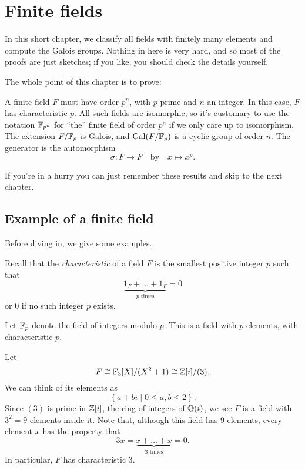 \chapter{Finite fields}
In this short chapter, we classify all fields with finitely many elements
and compute the Galois groups.
Nothing in here is very hard, and so most of the proofs are just sketches;
if you like, you should check the details yourself.

The whole point of this chapter is to prove:
\begin{itemize}
	\ii A finite field $F$ must have order $p^n$, with $p$ prime and $n$ an integer.
	\ii In this case, $F$ has characteristic $p$.
	\ii All such fields are isomorphic,
	so it's customary to use the notation $\mathbb F_{p^n}$
	for ``the'' finite field of order $p^n$ if we only care up to isomorphism.
	\ii The extension $F/\mathbb F_p$ is Galois, and $\operatorname{Gal}(F/\mathbb F_p)$ is a cyclic group of order $n$.
	The generator is the automorphism \[ \sigma \colon F \to F \quad\text{by}\quad x \mapsto x^p. \]
\end{itemize}
If you're in a hurry you can just remember these results and skip to the next chapter.

\section{Example of a finite field}
Before diving in, we give some examples.

Recall that the \emph{characteristic} of a field $F$
is the smallest positive integer $p$ such that
\[ \underbrace{1_F + \dots + 1_F}_{\text{$p$ times}} = 0 \]
or $0$ if no such integer $p$ exists.

\begin{example}
	Let $\mathbb F_p$ denote the field of integers modulo $p$.
	This is a field with $p$ elements, with characteristic $p$.
\end{example}

\begin{example}
	Let
	\[ F \cong \mathbb F_3[X]/(X^2+1) \cong \mathbb Z[i] / (3). \]
	We can think of its elements as \[ \left\{ a + bi \mid 0 \le a,b \le 2 \right\}. \]
	Since $(3)$ is prime in $\mathbb Z[i]$, the ring of integers of $\mathbb Q(i)$,
	we see $F$ is a field with $3^2 = 9$ elements inside it.
	Note that, although this field has $9$ elements, every element $x$ has the property that
	\[ 3x = \underbrace{x + \dots + x}_{\text{$3$ times}} = 0. \]
	In particular, $F$ has characteristic $3$.
\end{example}

